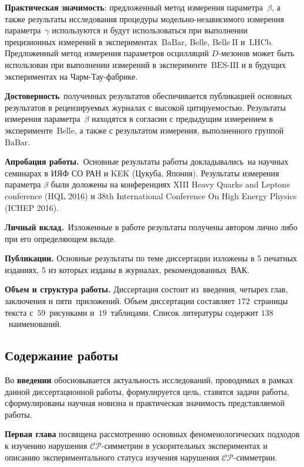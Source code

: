 \documentclass[a4paper,14pt]{extarticle} %
\newcommand{\pphi}{\ensuremath{\beta}\xspace}
\newcommand{\gphi}{\ensuremath{\gamma}\xspace}
\newcommand{\cpconj}{\ensuremath{\mathcal{CP}}\xspace}
\newcommand{\belle}{\ensuremath{\mathrm{Belle}}\xspace}
\newcommand{\belleii}{\ensuremath{\belle\:\mathrm{II}}\xspace}
\newcommand{\babar}{\ensuremath{\mathrm{BaBar}}\xspace}
\newcommand{\lhcb}{\ensuremath{\mathrm{LHCb}}\xspace}
\newcommand{\besiii}{\ensuremath{\textrm{BES-III}}\xspace}
\begin{document}
\textbf{Практическая значимость}: предложенный метод измерения параметра~\pphi, а также результаты исследования процедуры модельно-независимого измерения параметра~\gphi используются и будут использоваться при выполнении прецизионных измерений в экспериментах~\babar, \belle, \belleii и~\lhcb.  Предложенный метод измерения параметров осцилляций $D$-мезонов может быть использован при выполнении измерений в эксперименте~\besiii и в будущих экспериментах на Чарм-Тау-фабрике.

\textbf{Достоверность}\ полученных результатов обеспечивается публикацией основных результатов в рецензируемых журналах с высокой цитируемостью. Результаты измерения параметра~\pphi находятся в согласии с предыдущим измерением в эксперименте~\belle, а также с результатом измерения, выполненного группой~\babar.

\textbf{Апробация работы.}\ Основные результаты работы докладывались~на научных семинарах в ИЯФ СО РАН и KEK (Цукуба, Япония).  Результаты измерения параметра \pphi были доложены на конференциях XIII Heavy Quarks and Leptons conference (HQL 2016) и 38th International Conference On High Energy Physics (ICHEP 2016).

\textbf{Личный вклад.}\ Изложенные в работе результаты получены автором лично либо при его определяющем вкладе.

\textbf{Публикации.} Основные результаты по теме диссертации изложены в 5 печатных изданиях, 5 из которых изданы в журналах, рекомендованных~ВАК.

{\textbf{Объем и структура работы.}} Диссертация состоит из~введения, четырех глав, заключения и пяти~приложений. Объем диссертации составляет $172$~страницы текста с~$59$~рисунками и~$19$~таблицами. Список литературы содержит $138$~наименований.


\subsection*{Содержание работы}
Во {\textbf{введении}} обосновывается актуальность исследований, проводимых в рамках данной диссертационной работы, формулируется цель, ставятся задачи работы, сформулированы научная новизна и практическая значимость представляемой работы.

{\textbf{Первая глава}} посвящена рассмотрению основных феноменологических подходов к изучению нарушения \cpconj-симметрии в ускорительных экспериментах и описанию экспериментального статуса изучения нарушения \cpconj-симметрии.
\end{document}
